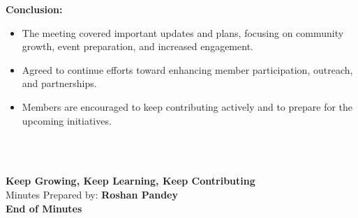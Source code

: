 \documentclass[a4paper,11pt]{article}
\begin{document}
\noindent\textbf{Conclusion:} \\
\begin{itemize}
    \item The meeting covered important updates and plans, focusing on community growth, event preparation, and increased engagement.
    \item Agreed to continue efforts toward enhancing member participation, outreach, and partnerships.
    \item Members are encouraged to keep contributing actively and to prepare for the upcoming initiatives.
\end{itemize}
\hfill\\
\hfill \\
\begin{center}
    \textbf{Keep Growing, Keep Learning, Keep Contributing}\\
    Minutes Prepared by: \textbf{Roshan Pandey} \\
    \textbf{End of Minutes}
\end{center}
\end{document}
